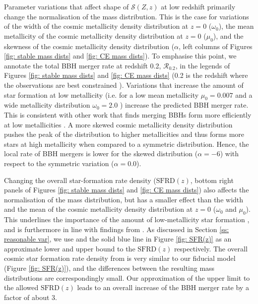 \documentclass[linenumbers,twocolumn]{aastex631}
\newcommand{\SFRDzZ}{\ensuremath{\mathcal{S}(Z,z)}\xspace}
\newcommand{\SFRDz}{\ensuremath{\mathrm{SFRD}(z)}\xspace}
\begin{document}
Parameter variations that affect shape of \SFRDzZ at low redshift primarily change the normalisation of the mass distribution. This is the case for variations of the width of the cosmic metallicity density distribution at $z=0$ ($\omega_0$), the mean metallicity of the cosmic metallicity density distribution at $z=0$ ($\mu_0$), and the skewness of the cosmic metallicity density distribution ($\alpha$, left columns of Figures \ref{fig: stable mass dists} and \ref{fig: CE mass dists}).
To emphasise this point, we annotate the total BBH merger rate at redshift 0.2, $\mathcal{R}_{0.2}$, in the legends of Figures \ref{fig: stable mass dists} and \ref{fig: CE mass dists} (0.2 is the redshift where the observations are best constrained \citealt{GWTC3_popPaper2021}). 
%
Variations that increase the amount of star formation at low metallicity (i.e. for a low mean metallicity $\mu_0=0.007$ and a wide metallicity distribution $\omega_0 = 2.0$ ) increase the predicted BBH merger rate. This is consistent with other work that finds merging BBHs form more efficiently at low metallicities \citep[e.g.][]{BelczynskiVink2010, Stevenson+2017,Mapelli2017,Chruslinska2019_effectCO,Broekgaarden+2021b}.
A more skewed cosmic metallicity density distribution pushes the peak of the distribution to higher metallicities and thus forms more stars at high metallicity when compared to a symmetric distribution. Hence, the local rate of BBH mergers is lower for the skewed distribution ($\alpha = -6$) with respect to the symmetric variation ($\alpha = 0.0$).


Changing the overall star-formation rate density (\SFRDz, bottom right panels of Figures \ref{fig: stable mass dists} and \ref{fig: CE mass dists}) also affects the normalisation of the mass distribution, but has a smaller effect than the width and the mean of the cosmic metallicity density distribution at $z=0$ ($\omega_0$ and $\mu_0$). This underlines the importance of the amount of low-metallicity star formation \citep[e.g.,][]{chruslinska2022_review}, and is furthermore in line with findings from \cite{Tang+2020}.
As discussed in Section \ref{ss: reasonable var}, we use \cite{Madau+2017} and the solid blue line in Figure \ref{fig: SFR(z)} as an approximate lower and upper bound to the \SFRDz respectively. 
The overall cosmic star formation rate density from \cite{Madau+2017} is very similar to our fiducial model (Figure \ref{fig: SFR(z)}), and the differences between the resulting mass distributions are correspondingly small. Our approximation of the upper limit to the allowed \SFRDz leads to an overall increase of the BBH merger rate by a factor of about 3. 
\end{document}
